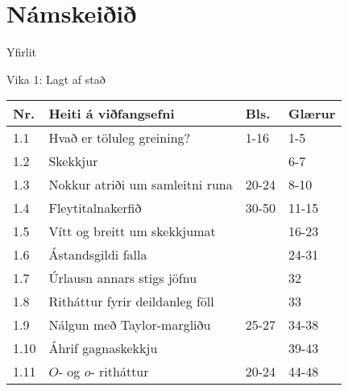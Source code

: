 \date{8., 10.~og 15.~janúar 2014}



\begin{frame}
	\maketitle
\end{frame}

\section*{Námskeiðið}

\begin{frame}{Yfirlit}
\begin{block}{Vika 1: Lagt af stað}
\begin{center}
\begin{tabular}{|l|l|l|l|}\hline
Nr. &Heiti á viðfangsefni &Bls.&Glærur\\
\hline
1.1 & Hvað er töluleg greining?&1-16&1-5\\
1.2 & Skekkjur& &6-7 \\
1.3 & Nokkur atriði um samleitni runa& 20-24&8-10\\
1.4 & Fleytitalnakerfið& 30-50&11-15\\
1.5 & Vítt og breitt um skekkjumat& &16-23 \\
1.6 & Ástandsgildi falla & &24-31\\
1.7 & Úrlausn annars stigs jöfnu & &32\\
1.8 & Ritháttur fyrir deildanleg föll& &33\\
1.9 & Nálgun með Taylor-margliðu& 25-27 &34-38\\
1.10 & Áhrif gagnaskekkju&  &39-43\\
1.11 & $O$- og $o$- ritháttur& 20-24 &44-48\\
\hline
\end{tabular}
\end{center}
\end{block}
\end{frame}

